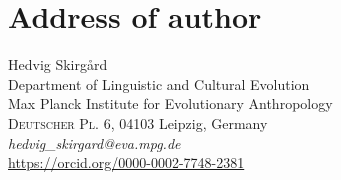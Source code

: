 \documentclass[12pt,letterpaper]{article}
\begin{document}


 
\newpage
\section*{Address of author}
Hedvig Skirgård\\
Department of Linguistic and Cultural Evolution\\
Max Planck Institute for Evolutionary Anthropology\\
\textsc{Deutscher Pl. 6, 04103}
Leipzig, Germany\\
\textit{hedvig\_{}skirgard@eva.mpg.de}\\
\url{https://orcid.org/0000-0002-7748-2381}


\newpage
\end{document}
